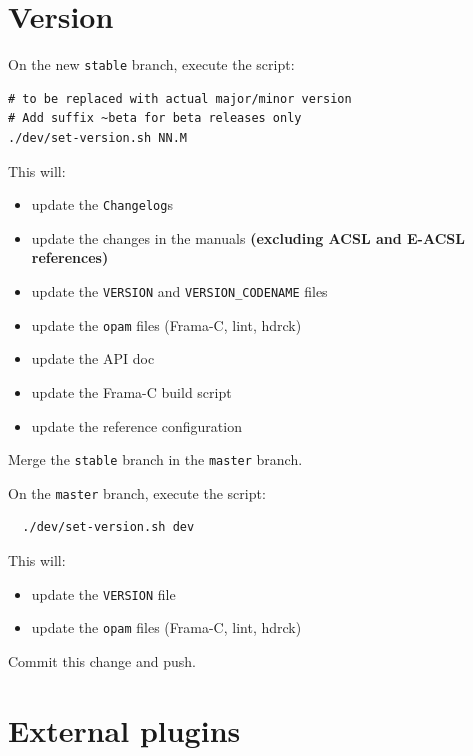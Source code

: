 \section{Version}
\label{sec:version}

On the new \texttt{stable} branch, execute the script:
\begin{verbatim}
# to be replaced with actual major/minor version
# Add suffix ~beta for beta releases only
./dev/set-version.sh NN.M
\end{verbatim}

This will:
\begin{itemize}
  \item update the \texttt{Changelog}s
  \item update the changes in the manuals \textbf{(excluding ACSL and E-ACSL references)}
  \item update the \texttt{VERSION} and \texttt{VERSION\_CODENAME} files
  \item update the \texttt{opam} files (Frama-C, lint, hdrck)
  \item update the API doc
  \item update the Frama-C build script
  \item update the reference configuration
\end{itemize}

Merge the \texttt{stable} branch in the \texttt{master} branch.

On the \texttt{master} branch, execute the script:
\begin{verbatim}
  ./dev/set-version.sh dev
\end{verbatim}
This will:
\begin{itemize}
  \item update the \texttt{VERSION} file
  \item update the \texttt{opam} files (Frama-C, lint, hdrck)
\end{itemize}

Commit this change and push.

\section{External plugins}
\label{sec:external-plugins}

